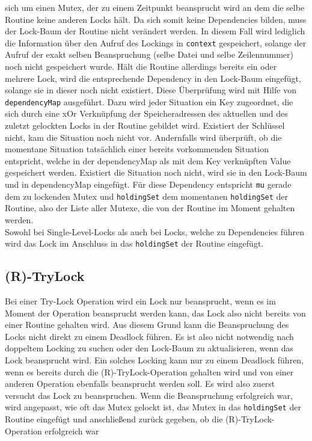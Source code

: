 sich um einen Mutex, der zu einem Zeitpunkt beansprucht wird an dem die 
selbe Routine keine anderen Locks hält. Da sich somit keine Dependencies bilden,
muss der Lock-Baum der Routine nicht verändert werden. In diesem Fall wird 
lediglich die Information über den Aufruf des Lockings in \texttt{context} gespeichert,
solange der Aufruf der exakt selben Beanspruchung (selbe Datei und selbe Zeilennummer)
noch nicht gespeichert wurde. Hält die Routine allerdings bereits ein oder 
mehrere Lock, wird die entsprechende Dependency in den Lock-Baum eingefügt,
solange sie in dieser noch nicht existiert. Diese Überprüfung wird mit Hilfe 
von \texttt{dependencyMap} ausgeführt. Dazu wird jeder Situation ein 
Key zugeordnet, die sich durch eine xOr Verknüpfung der Speicheradressen
des aktuellen und des zuletzt gelockten Locks in der Routine gebildet wird.
Existiert der Schlüssel nicht, kam die Situation noch nicht vor. Andernfalls 
wird überprüft, ob die momentane Situation tatsächlich einer bereits vorkommenden 
Situation entspricht, welche in der dependencyMap als mit dem Key verknüpften Value 
gespeichert werden.
Existiert die Situation noch nicht, wird sie in den 
Lock-Baum und in dependencyMap eingefügt. Für diese Dependency entspricht \texttt{mu}
gerade dem zu lockenden Mutex und \texttt{holdingSet} dem momentanen \texttt{holdingSet} 
der Routine, also der Liste aller Mutexe, die von der Routine im Moment gehalten 
werden.\\
Sowohl bei Single-Level-Locks als auch bei Locks, welche zu Dependencies führen
wird das Lock im Anschluss in das \texttt{holdingSet} der Routine eingefügt.
\subsection{(R)-TryLock}
Bei einer Try-Lock Operation wird ein Lock nur beansprucht, wenn es im Moment 
der Operation beansprucht werden kann, das Lock also nicht bereits von einer Routine 
gehalten wird. Aus diesem Grund kann die Beanspruchung des Locks nicht direkt 
zu einem Deadlock führen. Es ist also nicht notwendig nach doppeltem Locking 
zu suchen oder den Lock-Baum zu aktualisieren, wenn das Lock beansprucht wird.
Ein solches Locking kann nur zu einem Deadlock führen, wenn es bereits durch 
die (R)-TryLock-Operation gehalten wird und von einer anderen Operation ebenfalls 
beansprucht werden soll. Es wird also zuerst versucht das Lock zu beanspruchen.
Wenn die Beanspruchung erfolgreich war, wird angepasst, wie oft das Mutex gelockt ist,
das Mutex in das \texttt{holdingSet} der Routine eingefügt und anschließend zurück gegeben, ob die (R)-TryLock-Operation erfolgreich war
